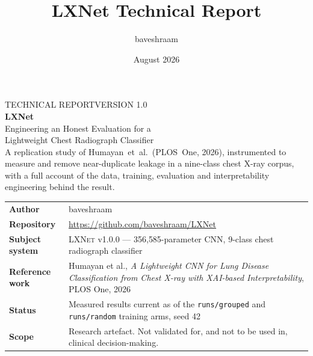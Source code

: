 \documentclass[11pt,a4paper,oneside]{report}
\title{LXNet Technical Report}
\author{baveshraam}
\date{August 2026}
\newcommand{\LXNet}{\textsc{LXNet}}
\begin{document}

\begin{titlepage}
\vspace*{1.6cm}
{\small\color{mutedgray}\MakeUppercase{Technical Report}\hfill\MakeUppercase{Version 1.0}}\\[2.2cm]
{\fontsize{46}{50}\selectfont\bfseries LXNet}\\[0.35cm]
{\Large\color{mutedgray} Engineering an Honest Evaluation for a\\[2pt] Lightweight Chest Radiograph Classifier}\\[1.4cm]
{\large A replication study of Humayan~et~al.\ (PLOS~One, 2026), instrumented to
measure and remove near-duplicate leakage in a nine-class chest X-ray corpus,
with a full account of the data, training, evaluation and interpretability
engineering behind the result.}
\vfill
\begin{tcolorbox}[colback=panelbg,colframe=rulegray,boxrule=0.6pt,arc=1pt,
  left=10pt,right=10pt,top=8pt,bottom=8pt,width=\textwidth]
\small
\begin{tabularx}{\linewidth}{@{}l X@{}}
\textbf{Author} & baveshraam \\
\textbf{Repository} & \url{https://github.com/baveshraam/LXNet} \\
\textbf{Subject system} & \LXNet{} v1.0.0 --- 356{,}585-parameter CNN, 9-class chest radiograph classifier \\
\textbf{Reference work} & Humayan et al., \textit{A Lightweight CNN for Lung Disease
Classification from Chest X-ray with XAI-based Interpretability}, PLOS One, 2026 \\
\textbf{Status} & Measured results current as of the \texttt{runs/grouped} and
\texttt{runs/random} training arms, seed 42 \\
\textbf{Scope} & Research artefact. Not validated for, and not to be used in,
clinical decision-making. \\
\end{tabularx}
\end{tcolorbox}
\vspace{0.4cm}
\end{titlepage}
\end{document}
